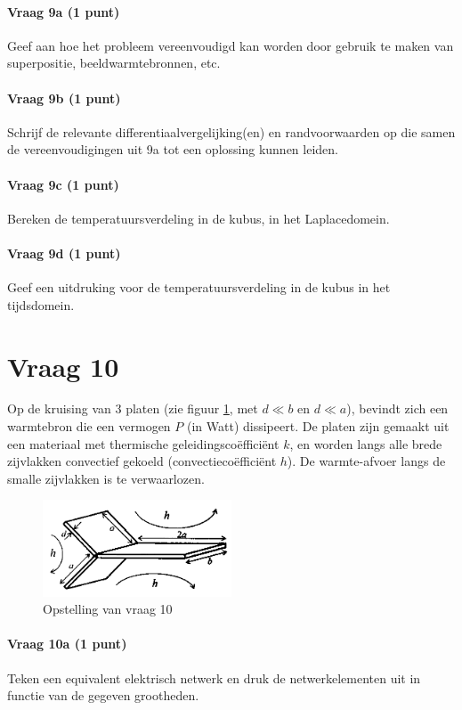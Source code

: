\documentclass[a4paper]{article}
\begin{document}
\paragraph{Vraag 9a (1 punt)}
Geef aan hoe het probleem vereenvoudigd kan worden door gebruik te maken van superpositie, beeldwarmtebronnen, etc.

\paragraph{Vraag 9b (1 punt)}
Schrijf de relevante differentiaalvergelijking(en) en randvoorwaarden op die samen de vereenvoudigingen uit 9a tot een oplossing kunnen leiden.

\paragraph{Vraag 9c (1 punt)}
Bereken de temperatuursverdeling in de kubus, in het Laplacedomein.

\paragraph{Vraag 9d (1 punt)}
Geef een uitdruking voor de temperatuursverdeling in de kubus in het tijdsdomein.

\section*{Vraag 10}
Op de kruising van 3 platen (zie figuur \ref{fig:vraag10}, met $d \ll b$ en $d \ll a$), bevindt zich een warmtebron die een vermogen $P$ (in Watt) dissipeert. De platen zijn gemaakt uit een materiaal met thermische geleidingscoëfficiënt $k$, en worden langs alle brede zijvlakken convectief gekoeld (convectiecoëfficiënt $h$). De warmte-afvoer langs de smalle zijvlakken is te verwaarlozen.

\begin{figure}[ht]
    \centering
    \includegraphics[width=0.5\textwidth]{vraag10}
    \caption{Opstelling van vraag 10}
    \label{fig:vraag10}
\end{figure}

\paragraph{Vraag 10a (1 punt)}
Teken een equivalent elektrisch netwerk en druk de netwerkelementen uit in functie van de gegeven grootheden.
\end{document}
